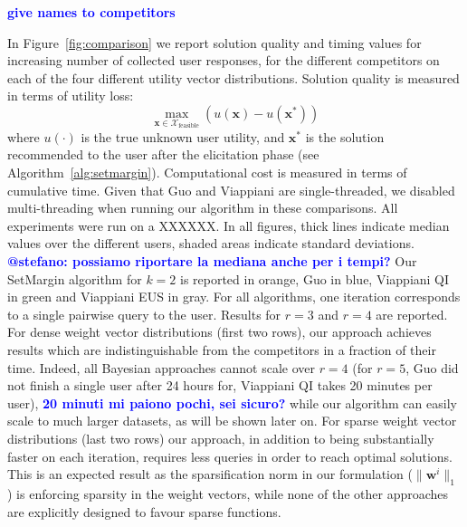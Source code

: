 \documentclass{article}
\renewcommand\[{\begin{equation}}
\renewcommand\]{\end{equation}}
\newcommand{\calvar}[1]{\ensuremath{\mathcal{#1}}}
\newcommand{\calX}{\calvar{X}}
\newcommand{\vecvar}[1]{\ensuremath{\boldsymbol{#1}}}
\newcommand{\vw}{\vecvar{w}}
\newcommand{\vx}{\vecvar{x}}
\newcommand{\andrea}[1]{{\bf \textcolor{blue}{{\fbox{Andrea:} #1}}}}
\newcommand{\stefano}[1]{{\bf \textcolor{green}{{\fbox{Stefano:} #1}}}}
\begin{document}
\andrea{give names to competitors}

In Figure~\ref{fig:comparison} we report solution quality and timing
values for increasing number of collected user responses, for the
different competitors on each of the four different utility vector
distributions. Solution quality is measured in terms of utility loss:
%
$$ \max_{\vx\in\calX_\text{feasible}} \left( u(\vx) - u(\vx^*) \right) $$
%
where $u(\cdot)$ is the true unknown user utility, and $\vx^*$ is the
solution recommended to the user after the elicitation phase (see
Algorithm~\ref{alg:setmargin}). Computational cost is measured in
terms of cumulative time. Given that Guo and Viappiani are
single-threaded, we disabled multi-threading when running our
algorithm in these comparisons. All experiments were run on a XXXXXX.
In all figures, thick lines indicate median values over the different
users, shaded areas indicate standard deviations. \andrea{@stefano:
  possiamo riportare la mediana anche per i tempi?}  Our {\sc
  SetMargin} algorithm for $k=2$ is reported in orange, Guo in blue,
Viappiani QI in green and Viappiani EUS in gray. For all algorithms,
one iteration corresponds to a single pairwise query to the user.
Results for $r=3$ and $r=4$ are reported.  For dense weight vector
distributions (first two rows), our approach achieves results which
are indistinguishable from the competitors in a fraction of their
time.  Indeed, all Bayesian approaches cannot scale over $r=4$ (for
$r=5$, Guo did not finish a single user after 24 hours for, Viappiani
QI takes 20 minutes per user), \andrea{20 minuti mi paiono pochi, sei
  sicuro?}  while our algorithm can easily scale to much larger
datasets, as will be shown later on. For sparse weight vector
distributions (last two rows) our approach, in addition to being
substantially faster on each iteration, requires less queries in order
to reach optimal solutions. This is an expected result as the
sparsification norm in our formulation ($\| \vw^{i} \|_1$) is
enforcing sparsity in the weight vectors, while none of the other
approaches are explicitly designed to favour sparse functions.



\end{document}
